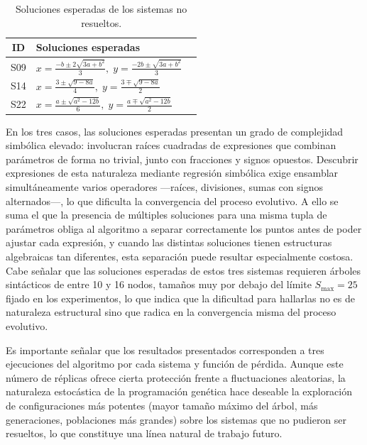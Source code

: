 \begin{table}[H] \centering \caption{Soluciones esperadas de los sistemas no resueltos.} \label{tab:sistemas_fallidos} \renewcommand{\arraystretch}{1.4} \begin{tabular}{cll} \hline
ID & Soluciones esperadas \\
\hline S09 & $x = \frac{-b \pm 2\sqrt{3a+b^{2}}}{3},\; y = \frac{-2b \pm \sqrt{3a+b^{2}}}{3}$ \\[6pt] S14 & $x = \frac{3 \pm \sqrt{9-8a}}{4},\; y = \frac{3 \mp \sqrt{9-8a}}{2}$ \\[6pt] S22 & $x = \frac{a \pm \sqrt{a^{2}-12b}}{6},\;
		  y = \frac{a \mp \sqrt{a^{2}-12b}}{2}$ \\
\hline \end{tabular} \end{table}

En los tres casos, las soluciones esperadas presentan un grado de complejidad simbólica elevado: involucran raíces cuadradas de expresiones que combinan parámetros de forma no trivial, junto con fracciones y signos opuestos. Descubrir expresiones de esta naturaleza mediante regresión simbólica exige ensamblar simultáneamente varios operadores —raíces, divisiones, sumas con signos alternados—, lo que dificulta la convergencia del proceso evolutivo. A ello se suma el que la presencia de múltiples soluciones para una misma tupla de parámetros obliga al algoritmo a separar correctamente los puntos antes de poder ajustar cada expresión, y cuando las distintas soluciones tienen estructuras algebraicas tan diferentes, esta separación puede resultar especialmente costosa. Cabe señalar que las soluciones esperadas de estos tres sistemas requieren árboles sintácticos de entre 10 y 16 nodos, tamaños muy por debajo del límite $S_{\max} = 25$ fijado en los experimentos, lo que indica que la dificultad para hallarlas no es de naturaleza estructural sino que radica en la convergencia misma del proceso evolutivo.

Es importante señalar que los resultados presentados corresponden a tres ejecuciones del algoritmo por cada sistema y función de pérdida. Aunque este número de réplicas ofrece cierta protección frente a fluctuaciones aleatorias, la naturaleza estocástica de la programación genética hace deseable la exploración de configuraciones más potentes (mayor tamaño máximo del árbol, más generaciones, poblaciones más grandes) sobre los sistemas que no pudieron ser resueltos, lo que constituye una línea natural de trabajo futuro.

